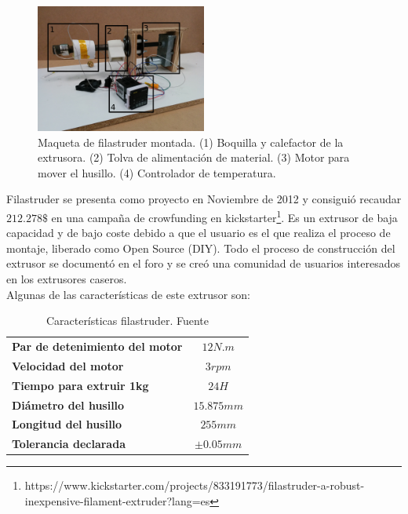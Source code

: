     \begin{figure}[!hd]
            \centering
            \includegraphics[width=0.5\textwidth]{images/filaextruder/IMG_20150313_11163.jpg}
            \caption[Maqueta de filastruder montada]{Maqueta de filastruder montada. (1) Boquilla y calefactor de la extrusora. (2) Tolva de alimentación de material. (3) Motor para mover el husillo. (4) Controlador de temperatura.}
            \label{fig:hardware_filastruder}
    \end{figure}

Filastruder se presenta como proyecto en Noviembre de 2012 \cite{filastruder} y consiguió recaudar $212.278 \$$ en una campaña de crowfunding en kickstarter\footnote{https://www.kickstarter.com/projects/833191773/filastruder-a-robust-inexpensive-filament-extruder?lang=es}. Es un extrusor de baja capacidad y de bajo coste debido a que el usuario es el que realiza el proceso de montaje, liberado como Open Source (DIY). Todo el proceso de construcción del extrusor se documentó en el foro y se creó una comunidad de usuarios interesados en los extrusores caseros.\\

Algunas de las características de este extrusor son:

\begin{table}[H]
    \centering

        \begin{tabular}{lc}
        \textbf{Par de detenimiento del motor}            & $12N.m$                           \\
        \textbf{Velocidad del motor}                      & $3 rpm$                           \\
        \textbf{Tiempo para extruir 1kg}                  & $24H$                             \\
        \textbf{Diámetro del husillo}                     & $15.875mm$                        \\
        \textbf{Longitud del husillo}                     & $255mm$                           \\
        \textbf{Tolerancia declarada}                     & $\pm 0.05 mm$                     \\   

    \end{tabular}
    \caption[Características filastruder.]{Características filastruder. Fuente\cite{tfg_diego}}
    \label{tab:caract_filas}
\end{table}

